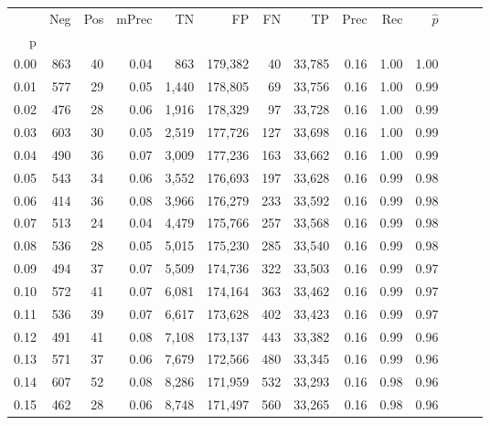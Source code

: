 \begin{tabular}{rrrrrrrrrrrrrr}
\toprule
{} &    Neg &    Pos & mPrec &       TN &       FP &      FN &      TP &  Prec &   Rec & $\hat{p}$ \\
p    &        &        &       &          &          &         &         &       &       &           \\
\midrule
0.00 &    863 &     40 &  0.04 &      863 &  179,382 &      40 &  33,785 &  0.16 &  1.00 &      1.00 \\
0.01 &    577 &     29 &  0.05 &    1,440 &  178,805 &      69 &  33,756 &  0.16 &  1.00 &      0.99 \\
0.02 &    476 &     28 &  0.06 &    1,916 &  178,329 &      97 &  33,728 &  0.16 &  1.00 &      0.99 \\
0.03 &    603 &     30 &  0.05 &    2,519 &  177,726 &     127 &  33,698 &  0.16 &  1.00 &      0.99 \\
0.04 &    490 &     36 &  0.07 &    3,009 &  177,236 &     163 &  33,662 &  0.16 &  1.00 &      0.99 \\
0.05 &    543 &     34 &  0.06 &    3,552 &  176,693 &     197 &  33,628 &  0.16 &  0.99 &      0.98 \\
0.06 &    414 &     36 &  0.08 &    3,966 &  176,279 &     233 &  33,592 &  0.16 &  0.99 &      0.98 \\
0.07 &    513 &     24 &  0.04 &    4,479 &  175,766 &     257 &  33,568 &  0.16 &  0.99 &      0.98 \\
0.08 &    536 &     28 &  0.05 &    5,015 &  175,230 &     285 &  33,540 &  0.16 &  0.99 &      0.98 \\
0.09 &    494 &     37 &  0.07 &    5,509 &  174,736 &     322 &  33,503 &  0.16 &  0.99 &      0.97 \\
0.10 &    572 &     41 &  0.07 &    6,081 &  174,164 &     363 &  33,462 &  0.16 &  0.99 &      0.97 \\
0.11 &    536 &     39 &  0.07 &    6,617 &  173,628 &     402 &  33,423 &  0.16 &  0.99 &      0.97 \\
0.12 &    491 &     41 &  0.08 &    7,108 &  173,137 &     443 &  33,382 &  0.16 &  0.99 &      0.96 \\
0.13 &    571 &     37 &  0.06 &    7,679 &  172,566 &     480 &  33,345 &  0.16 &  0.99 &      0.96 \\
0.14 &    607 &     52 &  0.08 &    8,286 &  171,959 &     532 &  33,293 &  0.16 &  0.98 &      0.96 \\
0.15 &    462 &     28 &  0.06 &    8,748 &  171,497 &     560 &  33,265 &  0.16 &  0.98 &      0.96 \\

\end{tabular}
